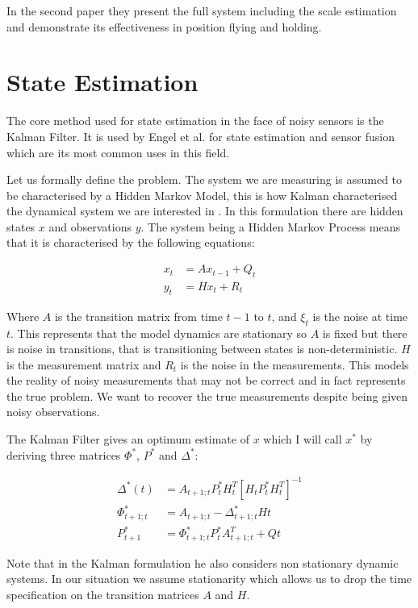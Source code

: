 \documentclass[]{../resources/final_report}
\begin{document}
In the second paper \cite{Engel:FigureFlying} they present the full system including the scale 
estimation and demonstrate its effectiveness in position flying and holding.


\section{State Estimation}

The core method used for state estimation in the face of noisy sensors is the Kalman Filter. It is 
used by Engel et al.\cite{Engel:Camera-basedNav} for state estimation and sensor fusion which are 
its most common uses in this field.

Let us formally define the problem. The system we are measuring is assumed to be characterised by a 
Hidden Markov Model, this is how Kalman characterised the dynamical system we are interested in \cite{Kalman1960ANA}. 
In this formulation there are hidden states $x$ and observations $y$. The system being a Hidden 
Markov Process means that it is characterised by the following equations:

\begin{align}
  x_t &= Ax_{t-1} + Q_t \\
  y_t &= Hx_t + R_t
\end{align}

Where $A$ is the transition matrix from time $t-1$ to $t$, and $\xi_t$ is the noise at time $t$. 
This represents that the model dynamics are stationary so $A$ is fixed but there is noise in 
transitions, that is transitioning between states is non-deterministic. $H$ is the measurement 
matrix and $R_t$ is the noise in the measurements. This models the reality of noisy measurements 
that may not be correct and in fact represents the true problem. We want to recover the true 
measurements despite being given noisy observations.

The Kalman Filter gives an optimum estimate of $x$ which I will call $x^*$ by deriving three matrices 
$\Phi^*$, $P^*$ and $\Delta^*$:

\begin{align}
  \Delta^*(t) &= A_{t+1;t}P^*_tH^T_t[H_tP^*_tH^T_t]^{-1} \\
  \Phi^*_{t+1;t} &= A_{t+1;t} - \Delta^*_{t+1;t}H{t} \\
  P^*_{t+1} &= \Phi^*_{t+1;t}P^*_tA^T_{t+1;t} + Q{t}
\end{align}


Note that in the Kalman formulation he also considers non stationary dynamic systems. In our 
situation we assume stationarity which allows us to drop the time specification on the transition 
matrices $A$ and $H$.
\end{document}
